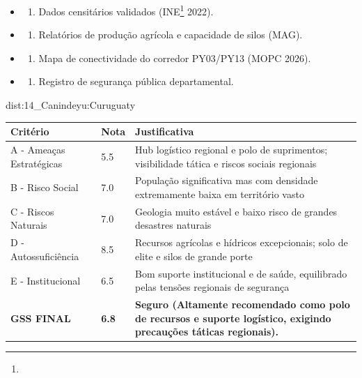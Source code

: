{\begin{itemize}
\tightlist
\item
  \begin{enumerate}
  \def\labelenumi{\arabic{enumi})}
  \tightlist
  \item
    Dados censitários validados (INE\footnote{\fineINE} 2022).
  \end{enumerate}
\item
  \begin{enumerate}
  \def\labelenumi{\arabic{enumi})}
  \setcounter{enumi}{1}
  \tightlist
  \item
    Relatórios de produção agrícola e capacidade de silos (MAG).
  \end{enumerate}
\item
  \begin{enumerate}
  \def\labelenumi{\arabic{enumi})}
  \setcounter{enumi}{2}
  \tightlist
  \item
    Mapa de conectividade do corredor PY03/\allowbreak PY13 (MOPC 2026).
  \end{enumerate}
\item
  \begin{enumerate}
  \def\labelenumi{\arabic{enumi})}
  \setcounter{enumi}{3}
  \tightlist
  \item
    Registro de segurança pública departamental.
  \end{enumerate}
\end{itemize}}{dist:14_Canindeyu:Curuguaty}
\begin{table}[ht!]
\small \begin{tabular}{p{3.0cm}p{0.8cm}p{6.0cm}} \toprule
\textbf{Critério} & \textbf{Nota} & \textbf{Justificativa} \\ \midrule
A - Ameaças Estratégicas & 5.5 & Hub logístico regional e polo de suprimentos; visibilidade tática e riscos sociais regionais \\
B - Risco Social & 7.0 & População significativa mas com densidade extremamente baixa em território vasto \\
C - Riscos Naturais & 7.0 & Geologia muito estável e baixo risco de grandes desastres naturais \\
D - Autossuficiência & 8.5 & Recursos agrícolas e hídricos excepcionais; solo de elite e silos de grande porte \\
E - Institucional & 6.5 & Bom suporte institucional e de saúde, equilibrado pelas tensões regionais de segurança \\
\midrule \textbf{GSS FINAL} & \textbf{6.8} & \textbf{Seguro (Altamente recomendado como polo de recursos e suporte logístico, exigindo precauções táticas regionais).} \\ \bottomrule \end{tabular}
\end{table}
